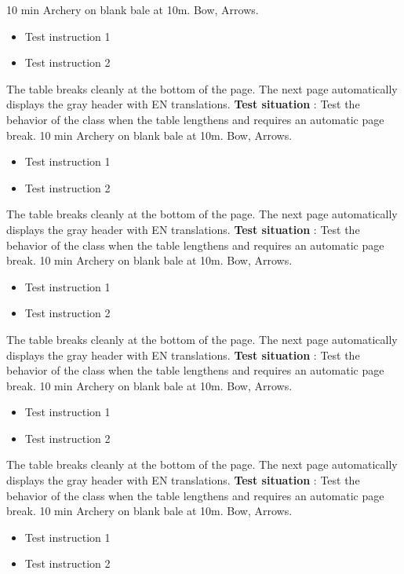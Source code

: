 \documentclass{../tex/ficheseance}
\begin{document}
\begin{tableauSeance}
		{10 min}
		{Archery on blank bale at 10m.}
		{Bow, Arrows.}
		{\begin{itemize}
			\item Test instruction 1
			\item Test instruction 2
		\end{itemize}}
		{The table breaks cleanly at the bottom of the page.}
		{The next page automatically displays the gray header with EN translations.}		
		\ligneSeance
		{\textbf{Test situation} : Test the behavior of the class when the table lengthens and requires an automatic page break.}
		{10 min}
		{Archery on blank bale at 10m.}
		{Bow, Arrows.}
		{\begin{itemize}
			\item Test instruction 1
			\item Test instruction 2
		\end{itemize}}
		{The table breaks cleanly at the bottom of the page.}
		{The next page automatically displays the gray header with EN translations.}		
		\ligneSeance
		{\textbf{Test situation} : Test the behavior of the class when the table lengthens and requires an automatic page break.}
		{10 min}
		{Archery on blank bale at 10m.}
		{Bow, Arrows.}
		{\begin{itemize}
			\item Test instruction 1
			\item Test instruction 2
		\end{itemize}}
		{The table breaks cleanly at the bottom of the page.}
		{The next page automatically displays the gray header with EN translations.}		
		\ligneSeance
		{\textbf{Test situation} : Test the behavior of the class when the table lengthens and requires an automatic page break.}
		{10 min}
		{Archery on blank bale at 10m.}
		{Bow, Arrows.}
		{\begin{itemize}
			\item Test instruction 1
			\item Test instruction 2
		\end{itemize}}
		{The table breaks cleanly at the bottom of the page.}
		{The next page automatically displays the gray header with EN translations.}		
		\ligneSeance
		{\textbf{Test situation} : Test the behavior of the class when the table lengthens and requires an automatic page break.}
		{10 min}
		{Archery on blank bale at 10m.}
		{Bow, Arrows.}
		{\begin{itemize}
			\item Test instruction 1
			\item Test instruction 2

\end{itemize}}
\end{tableauSeance}
\end{document}
